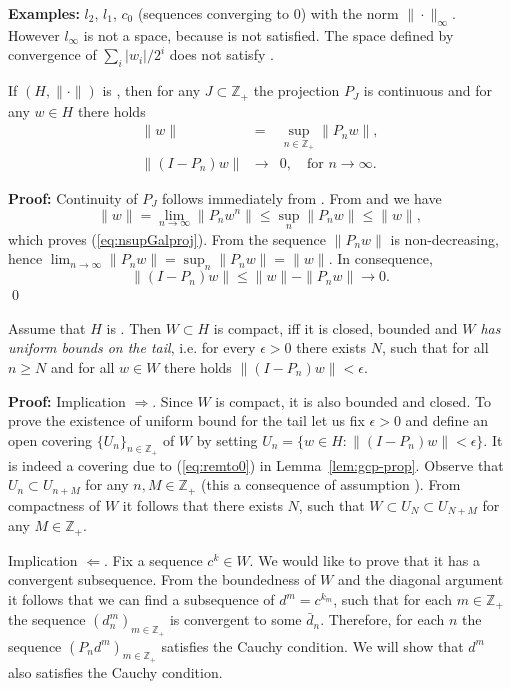 \textbf{Examples:} $l_2$, $l_1$, $c_0$ (sequences converging to $0$) with the norm $\|\cdot\|_\infty$. However $l_\infty$ is not a \gss space, because  is not satisfied.
The space defined by convergence of $\sum_i |w_i|/2^i$ does not satisfy .


\begin{lemma}
\label{lem:gcp-prop}
If $(H,\|\cdot\|)$  is \gss, then  for any $J \subset \mathbb{Z}_+$ the projection $P_J$ is continuous and for any $w \in H$ there holds
\begin{eqnarray}
    \|w\|&=&\sup_{n \in \mathbb{Z}_+} \|P_n w\|, \label{eq:nsupGalproj} \\
    \|(I-P_n) w\| &\to& 0, \quad \mbox{for $n \to \infty$}.  \label{eq:remto0}
\end{eqnarray}
\end{lemma}
\textbf{Proof:}
Continuity of $P_J$ follows immediately from . From  and  we have
$$\|w\|=\lim_{n\to\infty}\|P_n w^n\|\leq \sup_n\|P_nw\|\leq \|w\|,$$
which proves (\ref{eq:nsupGalproj}).
From  the sequence $\|P_nw\|$ is non-decreasing, hence $\lim_{n\to\infty}\|P_nw\|=\sup_{n}\|P_nw\|=\|w\|$. In consequence,
$$\|(I-P_n) w\|\leq \|w\|-\|P_nw\|\to 0.$$
\qed


\begin{lemma}
\label{lem:compt-gss}
  Assume that $H$ is \gss. Then $W \subset H$ is compact, iff it is closed, bounded and \emph{$W$ has uniform bounds on the tail}, i.e. for every $\epsilon >0$ there exists $N$, such that
  for all $n \geq N$ and for all $w \in W$ there holds $\|(I-P_n)w\| < \epsilon$.
\end{lemma}
\textbf{Proof:}
Implication $\Rightarrow$. Since $W$ is compact, it is also bounded and closed.  To prove the existence of uniform bound for the tail let us fix $\epsilon >0$
and define an open covering $\{U_n\}_{n \in \mathbb{Z}_+}$ of $W$ by setting $U_n=\{w \in H: \|(I-P_n)w\| < \epsilon\}$. It is indeed a covering due to (\ref{eq:remto0}) in Lemma~\ref{lem:gcp-prop}.
Observe that $U_n \subset U_{n+M}$ for any $n,M \in \mathbb{Z}_+$ (this a consequence of assumption ).
From compactness of $W$ it follows that there exists $N$, such that $W \subset U_N \subset U_{N+M}$ for any $M \in \mathbb{Z}_+$.


Implication $\Leftarrow$.  Fix a sequence $c^k \in W$. We would like to prove that it has a convergent subsequence. From the boundedness of $W$ and the diagonal argument it follows that we can find a subsequence of $d^m=c^{k_m}$, such that for each $m \in \mathbb{Z}_+$ the sequence $(d^m_n)_{m\in\mathbb Z_+}$ is convergent to some $\bar{d}_n$. Therefore, for each $n$ the sequence $(P_nd^m)_{m\in\mathbb Z_+}$ satisfies the Cauchy condition. We will show that $d^m$ also satisfies the Cauchy condition.


